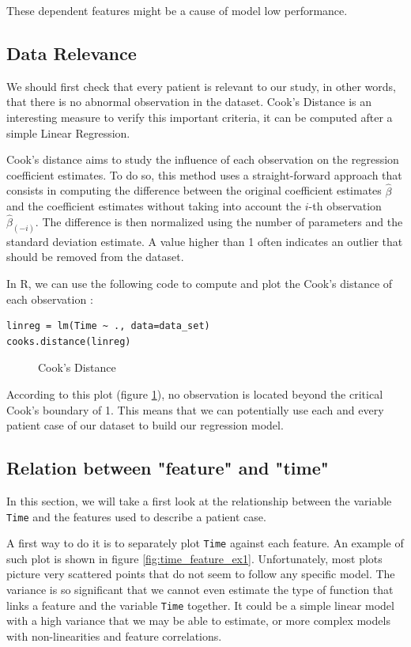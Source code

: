 \documentclass[]{report}
\newcommand{\inputtikz}[2]{%
	\scalebox{#1}{}  
}
\begin{document}
These dependent features might be a cause of model low performance.

\subsection{Data Relevance}
We should first check that every patient is relevant to our study, in other words, that there is no abnormal observation in the dataset. Cook's Distance is an interesting measure to verify this important criteria, it can be computed after a simple Linear Regression.

Cook's distance aims to study the influence of each observation on the regression coefficient estimates. To do so, this method uses a straight-forward approach that consists in computing the difference between the original coefficient estimates $\hat{\beta}$ and the coefficient estimates without taking into account the $i$-th observation $\hat{\beta}_{(-i)}$. The difference is then normalized using the number of parameters and the standard deviation estimate. A value higher than 1 often indicates an outlier that should be removed from the dataset.

In R, we can use the following code to compute and plot the Cook's distance of each observation :

\begin{lstlisting}
linreg = lm(Time ~ ., data=data_set)
cooks.distance(linreg)
\end{lstlisting} 

\begin{figure}[!h]
	\centering
	\inputtikz{0.5}{Figures/cooks_distance.tex}
	\caption{Cook's Distance}
	\label{fig:cook_distance}
\end{figure}

According to this plot (figure \ref{fig:cook_distance}), no observation is located beyond the critical Cook's boundary of 1. This means that we can potentially use each and every patient case of our dataset to build our regression model. 

\subsection{Relation between "feature" and "time"}
In this section, we will take a first look at the relationship between the variable \texttt{Time} and the features used to describe a patient case. 

A first way to do it is to separately plot \texttt{Time} against each feature. An example of such plot is shown in figure \ref{fig:time_feature_ex1}. Unfortunately, most plots picture very scattered points that do not seem to follow any specific model. The variance is so significant that we cannot even estimate the type of function that links a feature and the variable \texttt{Time} together. It could be a simple linear model with a high variance that we may be able to estimate, or more complex models with non-linearities and feature correlations.
\end{document}
